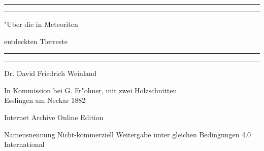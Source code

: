 \documentclass[a4paper, 11pt, oneside]{article}
\begin{document}
\begin{titlepage} %
	\centering %
	\scshape %

	
	\rule{\textwidth}{1.6pt}\vspace*{-\baselineskip}\vspace*{2pt} %
	\rule{\textwidth}{0.4pt} %
	
	\vspace{1.5\baselineskip} %
	
	{\LARGE "Uber die in Meteoriten}
	
	\vspace{1.2\baselineskip}
	
	{\LARGE entdeckten Tierreste}
	
	\vspace{1\baselineskip} %

	\rule{\textwidth}{0.4pt}\vspace*{-\baselineskip}\vspace{3.2pt} %
	\rule{\textwidth}{1.6pt} %
	
	\vspace{1\baselineskip} %
	
	
	{Dr. David Friedrich Weinland} %
	
	\vspace*{1\baselineskip} %
	
    {\small In Kommission bei G. Fr"ohner, mit zwei Holzschnitten\\ Esslingen am Neckar 1882} %
    
    \vspace*{\fill}

	{\small\scshape }

    Internet Archive Online Edition  %
	
	{\small Namensnennung Nicht-kommerziell Weitergabe unter gleichen Bedingungen 4.0 International} %
\end{titlepage}
\setlength{\parskip}{1mm plus1mm minus1mm}
\clearpage
\tableofcontents
\clearpage
\end{document}
